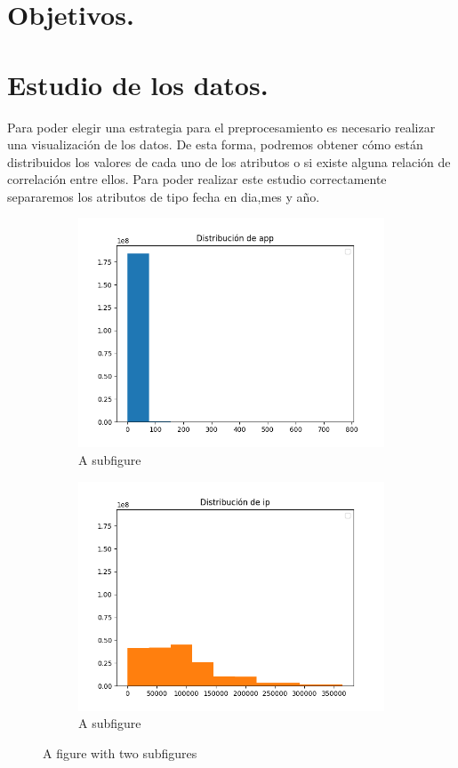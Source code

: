 \section{Objetivos.}
\section{Estudio de los datos.}
Para poder elegir una estrategia para el preprocesamiento es necesario realizar una visualización de los datos. De esta forma, podremos obtener cómo están distribuidos los valores de cada uno de los atributos o si existe alguna relación de correlación entre ellos. Para poder realizar este estudio correctamente separaremos los atributos de tipo fecha en dia,mes y año.
\begin{figure}[H]
	\centering
	\begin{subfigure}{.5\textwidth}
		\centering
		\includegraphics[scale=0.5]{img/app_distribution.png}
		\caption{A subfigure}
		\label{fig:sub1}
	\end{subfigure}%
	\begin{subfigure}{.5\textwidth}
		\centering
		\includegraphics[scale=0.5]{img/ip_distribution.png}
		\caption{A subfigure}
		\label{fig:sub2}
	\end{subfigure}
	\caption{A figure with two subfigures}
	\label{fig:test}
\end{figure}
